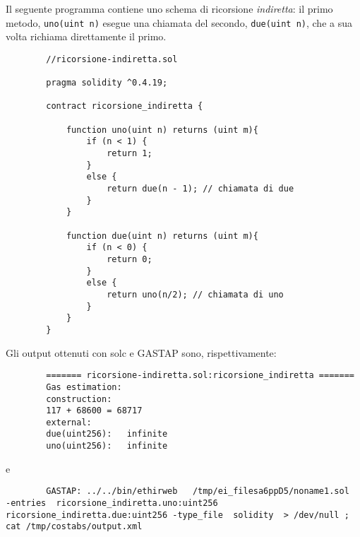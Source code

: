         Il seguente programma contiene uno schema di ricorsione \emph{indiretta}: il primo metodo, \verb|uno(uint n)| esegue una chiamata del secondo, \verb|due(uint n)|, che a sua volta richiama direttamente il primo.\newline
        
        \begin{minipage}{\linewidth}
        \begin{lstlisting}
        ​​//ricorsione-indiretta.sol

        pragma solidity ^0.4.19;

        contract ricorsione_indiretta {

            function uno(uint n) returns (uint m){
                if (n < 1) {
                    return 1;
                } 
                else {
                    return due(n - 1); // chiamata di due 
                }
            }

            function due(uint n) returns (uint m){
                if (n < 0) {
                    return 0;
                }
                else {
                    return uno(n/2); // chiamata di uno 
                }
            }
        }
        \end{lstlisting}
        \end{minipage}
        
        Gli output ottenuti con solc e GASTAP sono, rispettivamente:
        
        \begin{minipage}{\linewidth}
        \begin{lstlisting}
        ======= ricorsione-indiretta.sol:ricorsione_indiretta =======
        Gas estimation:
        construction:
        117 + 68600 = 68717
        external:
        due(uint256):	infinite
        uno(uint256):	infinite
        \end{lstlisting}
        \end{minipage}

        e
        \begin{minipage}{\linewidth}
        \begin{lstlisting}
        GASTAP: ../../bin/ethirweb   /tmp/ei_filesa6ppD5/noname1.sol  -entries  ricorsione_indiretta.uno:uint256 ricorsione_indiretta.due:uint256 -type_file  solidity  > /dev/null ; cat /tmp/costabs/output.xml         
        \end{lstlisting}
        \end{minipage}

